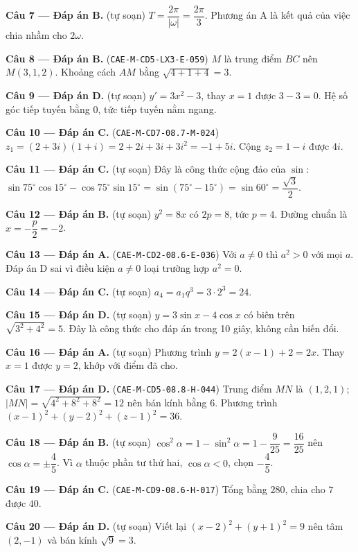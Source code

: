 \documentclass[11pt, a4paper]{article}
\begin{document}
\textbf{Câu 7 — Đáp án B.} (tự soạn) $T = \dfrac{2\pi}{\lvert \omega \rvert} = \dfrac{2\pi}{3}$. Phương án A là kết quả của việc chia nhầm cho $2\omega$.

\textbf{Câu 8 — Đáp án B.} (\texttt{CAE-M-CD5-LX3-E-059}) $M$ là trung điểm $BC$ nên $M(3, 1, 2)$. Khoảng cách $AM$ bằng $\sqrt{4 + 1 + 4} = 3$.

\textbf{Câu 9 — Đáp án D.} (tự soạn) $y' = 3x^2 - 3$, thay $x = 1$ được $3 - 3 = 0$. Hệ số góc tiếp tuyến bằng $0$, tức tiếp tuyến nằm ngang.

\textbf{Câu 10 — Đáp án C.} (\texttt{CAE-M-CD7-08.7-M-024}) $z_1 = (2+3i)(1+i) = 2 + 2i + 3i + 3i^2 = -1 + 5i$. Cộng $z_2 = 1 - i$ được $4i$.

\textbf{Câu 11 — Đáp án C.} (tự soạn) Đây là công thức cộng đảo của $\sin$: $\sin 75^\circ\cos 15^\circ - \cos 75^\circ\sin 15^\circ = \sin(75^\circ - 15^\circ) = \sin 60^\circ = \dfrac{\sqrt{3}}{2}$.

\textbf{Câu 12 — Đáp án B.} (tự soạn) $y^2 = 8x$ có $2p = 8$, tức $p = 4$. Đường chuẩn là $x = -\dfrac{p}{2} = -2$.

\textbf{Câu 13 — Đáp án A.} (\texttt{CAE-M-CD2-08.6-E-036}) Với $a \ne 0$ thì $a^2 > 0$ với mọi $a$. Đáp án D sai vì điều kiện $a \ne 0$ loại trường hợp $a^2 = 0$.

\textbf{Câu 14 — Đáp án C.} (tự soạn) $a_4 = a_1q^3 = 3 \cdot 2^3 = 24$.

\textbf{Câu 15 — Đáp án D.} (tự soạn) $y = 3\sin x - 4\cos x$ có biên trên $\sqrt{3^2 + 4^2} = 5$. Đây là công thức cho đáp án trong 10 giây, không cần biến đổi.

\textbf{Câu 16 — Đáp án A.} (tự soạn) Phương trình $y = 2(x - 1) + 2 = 2x$. Thay $x = 1$ được $y = 2$, khớp với điểm đã cho.

\textbf{Câu 17 — Đáp án D.} (\texttt{CAE-M-CD5-08.8-H-044}) Trung điểm $MN$ là $(1, 2, 1)$; $\lvert MN \rvert = \sqrt{4^2 + 8^2 + 8^2} = 12$ nên bán kính bằng $6$. Phương trình $(x-1)^2 + (y-2)^2 + (z-1)^2 = 36$.

\textbf{Câu 18 — Đáp án B.} (tự soạn) $\cos^2\alpha = 1 - \sin^2\alpha = 1 - \dfrac{9}{25} = \dfrac{16}{25}$ nên $\cos\alpha = \pm\dfrac{4}{5}$. Vì $\alpha$ thuộc phần tư thứ hai, $\cos\alpha < 0$, chọn $-\dfrac{4}{5}$.

\textbf{Câu 19 — Đáp án C.} (\texttt{CAE-M-CD9-08.6-H-017}) Tổng bằng $280$, chia cho $7$ được $40$.

\textbf{Câu 20 — Đáp án D.} (tự soạn) Viết lại $(x-2)^2 + (y+1)^2 = 9$ nên tâm $(2, -1)$ và bán kính $\sqrt{9} = 3$.
\end{document}
